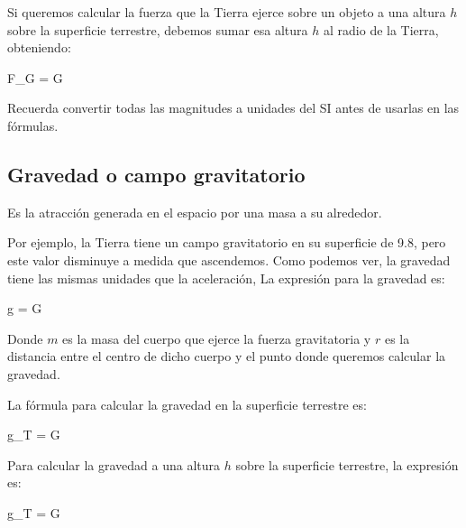 \vspace*{31pt}

Si queremos calcular la fuerza que la Tierra ejerce sobre un objeto a una altura \( h \) sobre la superficie terrestre, debemos sumar esa altura \( h \) al radio de la Tierra, obteniendo:
\begin{centeredequation}
    F_G = G \cdot {}
\end{centeredequation}

\begin{remark}
    Recuerda convertir todas las magnitudes a unidades del SI antes de usarlas en las fórmulas.
\end{remark}

\subsection{Gravedad o campo gravitatorio}
\begin{definition}
Es la atracción generada en el espacio por una masa a su alrededor.
\end{definition}

Por ejemplo, la Tierra tiene un campo gravitatorio en su superficie de \qty{9.8}{\mpss}, pero este valor disminuye a medida que ascendemos.
Como podemos ver, la gravedad tiene las mismas unidades que la aceleración, \unit{\mpss}
La expresión para la gravedad es:

\begin{centeredequation}
    g = G \cdot {}
\end{centeredequation}

Donde \( m \) es la masa del cuerpo que ejerce la fuerza gravitatoria y \( r \) es la distancia entre el centro de dicho cuerpo y el punto donde queremos calcular la gravedad.

La fórmula para calcular la gravedad en la superficie terrestre es:

\begin{centeredequation}
    g_T = G \cdot {}
\end{centeredequation}

Para calcular la gravedad a una altura \( h \) sobre la superficie terrestre, la expresión es:

\begin{centeredequation}
    g_T = G \cdot {}
\end{centeredequation}

